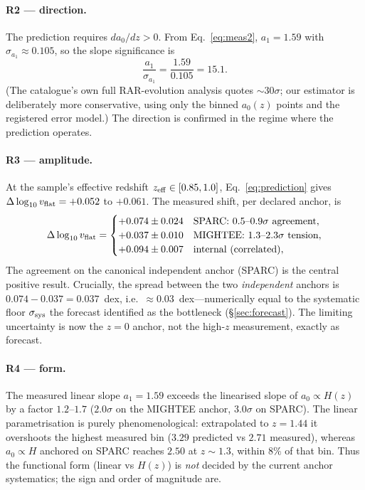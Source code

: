 \documentclass[fleqn,usenatbib]{mnras}
\newcommand{\dlogv}{\Delta\log_{10} v_{\rm flat}}
\newcommand{\azero}{a_0}
\newcommand{\ssys}{\sigma_{\rm sys}}
\begin{document}
\paragraph{R2 --- direction.} The prediction requires $da_0/dz>0$. From
Eq.~\eqref{eq:meas2}, $a_1=1.59$ with $\sigma_{a_1}\approx0.105$, so the slope
significance is
\begin{equation}
\frac{a_1}{\sigma_{a_1}}=\frac{1.59}{0.105}=15.1 .
\label{eq:R2}
\end{equation}
(The catalogue's own full RAR-evolution analysis quotes $\sim30\sigma$; our
estimator is deliberately more conservative, using only the binned $\azero(z)$
points and the registered error model.) The direction is confirmed in the regime
where the prediction operates.

\paragraph{R3 --- amplitude.} At the sample's effective redshift
$z_{\rm eff}\in[0.85,1.0]$, Eq.~\eqref{eq:prediction} gives $\dlogv=+0.052$ to
$+0.061$. The measured shift, per declared anchor, is
\begin{equation}
\dlogv=\begin{cases}
+0.074\pm0.024 & \text{SPARC: }0.5\text{--}0.9\sigma\ \text{agreement},\\
+0.037\pm0.010 & \text{MIGHTEE: }1.3\text{--}2.3\sigma\ \text{tension},\\
+0.094\pm0.007 & \text{internal (correlated)},
\end{cases}
\label{eq:R3}
\end{equation}
The agreement on the canonical independent anchor (SPARC) is the central positive
result. Crucially, the spread between the two \emph{independent} anchors is
$0.074-0.037=0.037$~dex, i.e.\ $\approx0.03$~dex---numerically equal to the
systematic floor $\ssys$ the forecast identified as the bottleneck
(\S\ref{sec:forecast}). The limiting uncertainty is now the $z=0$ anchor, not the
high-$z$ measurement, exactly as forecast.

\paragraph{R4 --- form.} The measured linear slope $a_1=1.59$ exceeds the
linearised slope of $\azero\propto H(z)$ by a factor $1.2$--$1.7$ ($2.0\sigma$ on the
MIGHTEE anchor, $3.0\sigma$ on SPARC). The linear parametrisation is purely
phenomenological: extrapolated to $z=1.44$ it overshoots the highest measured bin
($3.29$ predicted vs $2.71$ measured), whereas $\azero\propto H$ anchored on SPARC
reaches $2.50$ at $z\sim1.3$, within $8\%$ of that bin. Thus the functional form
(linear vs $H(z)$) is \emph{not} decided by the current anchor systematics; the sign
and order of magnitude are.
\end{document}

